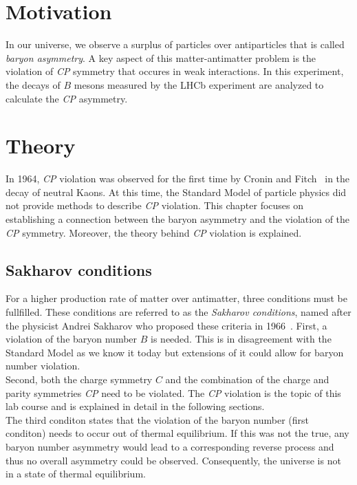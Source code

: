\section{Motivation}
In our universe, we observe a surplus of particles over antiparticles that is called \textit{baryon asymmetry}. A key aspect of this matter-antimatter 
problem is the violation of \textit{CP} symmetry that occures in weak interactions. In this experiment, the decays of $B$ mesons measured by the LHCb experiment
are analyzed to calculate the \textit{CP} asymmetry.

\section{Theory}
\label{sec:Theory}
In 1964, \textit{CP} violation was observed for the first time by Cronin and Fitch~\cite{Cronin_Fitch_cpv} in the decay of neutral Kaons. At this time, the Standard Model of 
particle physics did not provide methods to describe \textit{CP} violation. This chapter focuses on establishing a connection between the baryon asymmetry
and the violation of the \textit{CP} symmetry. Moreover, the theory behind \textit{CP} violation is explained.

\subsection{Sakharov conditions}
\label{sec:sakharov_conditions}
For a higher production rate of matter over antimatter, three conditions must be fullfilled. These conditions are referred to as the \textit{Sakharov conditions},
named after the physicist Andrei Sakharov who proposed these criteria in 1966~\cite{Sakharov_conditions}.
First, a violation of the baryon number $B$ is needed. This is in disagreement with the Standard Model as we know it today but extensions of it could
allow for baryon number violation. \\
Second, both the charge symmetry $C$ and the combination of the charge and parity symmetries \textit{CP} need to be violated. The \textit{CP} violation is the topic
of this lab course and is explained in detail in the following sections. \\
The third conditon states that the violation of the baryon number (first conditon) needs to occur out of thermal equilibrium. If this was not the true, any 
baryon number asymmetry would lead to a corresponding reverse process and thus no overall asymmetry could be observed. Consequently, the universe is not in
a state of thermal equilibrium.

